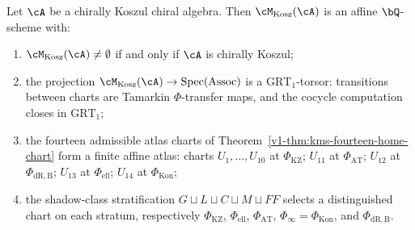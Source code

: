 \begin{theorem}
\label{thm:koszulness-moduli-kp}
Let $\cA$ be a chirally Koszul chiral algebra. Then
$\cM_{\mathrm{Kosz}}(\cA)$ is an affine $\bQ$-scheme with:
\begin{enumerate}[label=\textup{(A\arabic*)},leftmargin=3em]
\item
 $\cM_{\mathrm{Kosz}}(\cA) \neq \emptyset$ if and only if
 $\cA$ is chirally Koszul;
\item
 the projection
 $\cM_{\mathrm{Kosz}}(\cA) \to \mathrm{Spec}(\mathrm{Assoc})$
 is a $\mathrm{GRT}_1$-torsor: transitions between charts are
 Tamarkin $\Phi$-transfer maps, and the cocycle computation
 closes in $\mathrm{GRT}_1$;
\item
 the fourteen admissible atlas charts of
 Theorem~\ref{v1-thm:kms-fourteen-home-chart} form a finite affine
 atlas: charts $U_1, \ldots, U_{10}$ at $\Phi_{\mathrm{KZ}}$;
 $U_{11}$ at $\Phi_{\mathrm{AT}}$;
 $U_{12}$ at $\Phi_{\mathrm{dR,B}}$;
 $U_{13}$ at $\Phi_{\mathrm{ell}}$;
 $U_{14}$ at $\Phi_{\mathrm{Kon}}$;
\item
 the shadow-class stratification $G \sqcup L \sqcup C \sqcup M
 \sqcup FF$ selects a distinguished chart on each stratum,
 respectively $\Phi_{\mathrm{KZ}}$, $\Phi_{\mathrm{ell}}$,
 $\Phi_{\mathrm{AT}}$, $\Phi_\infty = \Phi_{\mathrm{Kon}}$,
 and $\Phi_{\mathrm{dR,B}}$.
\end{enumerate}
\end{theorem}

